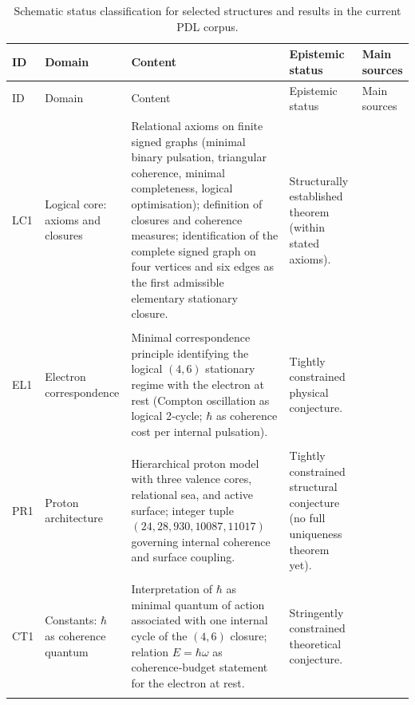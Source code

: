 \documentclass[11pt,a4paper]{article}
\begin{document}
\begin{longtable}{L{0.8cm}L{1.9cm}L{5.9cm}L{3cm}L{2.2cm}}
\caption{Schematic status classification for selected structures and results in the current PDL corpus.}
\label{tab:status}\\
\toprule
ID & Domain & Content & Epistemic status & Main sources \\
\midrule
\endfirsthead
\toprule
ID & Domain & Content & Epistemic status & Main sources \\
\midrule
\endhead
\bottomrule
\endfoot

LC1 &
Logical core: axioms and closures &
Relational axioms on finite signed graphs (minimal binary pulsation, triangular coherence, minimal completeness, logical optimisation); definition of closures and coherence measures; identification of the complete signed graph on four vertices and six edges as the first admissible elementary stationary closure. &
Structurally established theorem (within stated axioms). &
\citep{PDL_Main_2026,Minimal_Stationary_Closures_2026,PDL_intro,PDL_position} \\\\[0.4em]

EL1 &
Electron correspondence &
Minimal correspondence principle identifying the logical $(4,6)$ stationary regime with the electron at rest (Compton oscillation as logical 2‑cycle; $\hbar$ as coherence cost per internal pulsation). &
Tightly constrained physical conjecture. &
\citep{PDL_Main_2026,PDL_intro,PDL_position} \\\\[0.4em]

PR1 &
Proton architecture &
Hierarchical proton model with three valence cores, relational sea, and active surface; integer tuple $(24,28,930,10087,11017)$ governing internal coherence and surface coupling. &
Tightly constrained structural conjecture (no full uniqueness theorem yet). &
\citep{Combinatorial_Proton_v2_2026,Proton_Local_Uniqueness_2026,PDL_intro,PDL_position} \\\\[0.4em]

CT1 &
Constants: $\hbar$ as coherence quantum &
Interpretation of $\hbar$ as minimal quantum of action associated with one internal cycle of the $(4,6)$ closure; relation $E=\hbar\omega$ as coherence‑budget statement for the electron at rest. &
Stringently constrained theoretical conjecture. &
\citep{PDL_Main_2026,PDL_intro,PDL_position} \\\\[0.4em]


\end{longtable}
\end{document}
